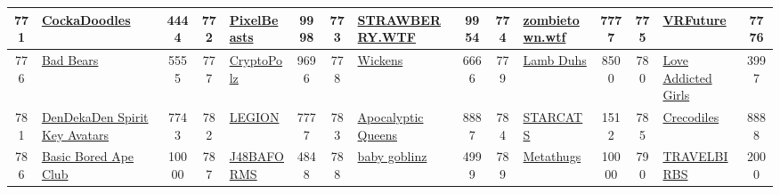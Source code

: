 \begin{table*}[]
{\begin{tabular}{|c|l|c|c|l|c|c|l|c|c|l|c|c|l|c|}
        771   & \href{https://cockadoodles.io}{CockaDoodles}                                       & 4444              & 772   & \href{https://www.pixelbeasts.co}{PixelBeasts}                                                    & 9998              & 773   & \href{https://www.strawberry.wtf/}{STRAWBERRY.WTF}                                & 9954              & 774   & \href{http://zombiestown.wtf}{zombietown.wtf}                                 & 7777              & 775   & \href{http://www.vrfuture.io}{VRFuture}                                                   & 7776                                    \\ \hline
        776   & \href{http://badbears.io}{Bad Bears}                                               & 5555              & 777   & \href{https://cryptopolz.com}{CryptoPolz}                                                         & 9696              & 778   & \href{http://www.wickensnft.net/}{Wickens}                                        & 6666              & 779   & \href{https://duhverse.com}{Lamb Duhs}                                        & 8500              & 780   & \href{https://lag.soudan-nft.xyz/}{Love Addicted Girls}                                   & 3997                                    \\ \hline
        781   & \href{https://www.dendekaden.com/}{DenDekaDen Spirit Key Avatars}                  & 7743              & 782   & \href{https://www.godlylegion.xyz/}{LEGION}                                                       & 7777              & 783   & \href{https://apocalypticapes.com/}{Apocalyptic Queens}                           & 8887              & 784   & \href{https://starcats.io/}{STARCATS}                                         & 1512              & 785   & \href{https://www.creco.xyz}{Crecodiles}                                                  & 8888                                    \\ \hline
        786   & \href{https://opensea.io/collection/basicboredapeclub}{Basic Bored Ape Club}       & 10000             & 787   & \href{https://j48baforms.io}{J48BAFORMS}                                                          & 4848              & 788   & \href{https://opensea.io/collection/baby-goblinz}{baby goblinz}                   & 4999              & 789   & \href{https://www.metathugs.io/}{Metathugs}                                   & 10000             & 790   & \href{https://www.proof.xyz/}{TRAVELBIRBS}                                                & 2000                                    \\ \hline

\end{tabular}}
\end{table*}
